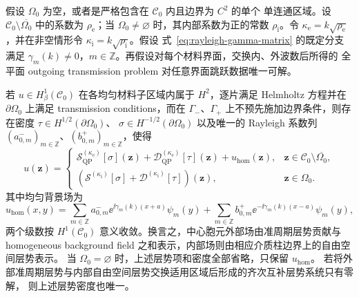 \begin{theorem}[中心胞元的层势与均匀背景场表示]
  \label{thm:center-cell-representation}
  假设 $\Omega_0$ 为空，或者是严格包含在 $\mathcal C_0$ 内且边界为 $C^2$ 的单个
  单连通区域。设 $\mathcal C_0\setminus\overline{\Omega_0}$ 中的系数为
  $\rho_{\mathrm e}$；当 $\Omega_0\ne\varnothing$ 时，其内部系数为正的常数
  $\rho_{\mathrm i}$。令 $\kappa_{\mathrm e}=k\sqrt{\rho_{\mathrm e}}$，并在非空情形令
  $\kappa_{\mathrm i}=k\sqrt{\rho_{\mathrm i}}$。假设
  式~\eqref{eq:rayleigh-gamma-matrix} 的既定分支满足
  $\gamma_m(k)\neq0$，$m\in\mathbb Z$。再假设对每个材料界面，交换内、外波数后所得的
  全平面 outgoing transmission problem 对任意界面跳跃数据唯一可解。

  若 $u\in H^1_\beta(\mathcal C_0)$ 在各均匀材料子区域内属于 $H^2$，逐片满足
  Helmholtz 方程并在 $\partial\Omega_0$ 上满足 transmission conditions，而在
  $\Gamma_-$、$\Gamma_+$ 上不预先施加边界条件，则存在密度
  $\tau\in H^{1/2}(\partial\Omega_0)$、
  $\sigma\in H^{-1/2}(\partial\Omega_0)$ 以及唯一的 Rayleigh 系数列
  $(a_{0,m}^-)_{m\in\mathbb Z}$、$(b_{0,m}^+)_{m\in\mathbb Z}$，使得
  \begin{equation*}
    u(\mathbf z)=
    \begin{cases}
      \displaystyle
        \mathcal S_{\mathrm{QP}}^{(\kappa_{\mathrm e})}[\sigma](\mathbf z)
        +\mathcal D_{\mathrm{QP}}^{(\kappa_{\mathrm e})}[\tau](\mathbf z)
      +u_{\mathrm{hom}}(\mathbf z),
      &\mathbf z\in\mathcal C_0\setminus\overline{\Omega_0},\\[2mm]
      \displaystyle
      \left(
        \mathcal S^{(\kappa_{\mathrm i})}[\sigma]
        +\mathcal D^{(\kappa_{\mathrm i})}[\tau]
      \right)(\mathbf z),
      &\mathbf z\in\Omega_0.
    \end{cases}
  \end{equation*}
  其中均匀背景场为
  \begin{equation*}
    u_{\mathrm{hom}}(x,y)
    =\sum_{m\in\mathbb Z}a_{0,m}^-
      \ee^{\ii\gamma_m(k)(x+a)}\psi_m(y)
     +\sum_{m\in\mathbb Z}b_{0,m}^+
      \ee^{-\ii\gamma_m(k)(x-a)}\psi_m(y),
  \end{equation*}
  两个级数按 $H^1(\mathcal C_0)$ 意义收敛。换言之，中心胞元外部场由准周期层势贡献与
  homogeneous background field 之和表示，内部场则由相应介质柱边界上的自由空间层势表示。
  当 $\Omega_0=\varnothing$ 时，上述层势项和密度全部省略，只保留
  $u_{\mathrm{hom}}$。
  若将外部准周期层势与内部自由空间层势交换适用区域后形成的齐次互补层势系统只有零解，
  则上述层势密度也唯一。
\end{theorem}

